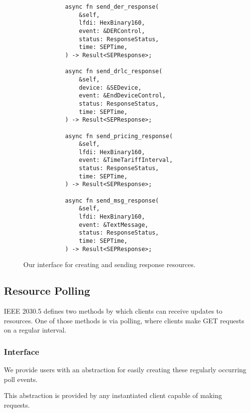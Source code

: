 \begin{figure}[h]
    \begin{center}
        \begin{lstlisting}
            async fn send_der_response(
                &self,
                lfdi: HexBinary160,
                event: &DERControl,
                status: ResponseStatus,
                time: SEPTime,
            ) -> Result<SEPResponse>;

            async fn send_drlc_response(
                &self,
                device: &SEDevice,
                event: &EndDeviceControl,
                status: ResponseStatus,
                time: SEPTime,
            ) -> Result<SEPResponse>;

            async fn send_pricing_response(
                &self,
                lfdi: HexBinary160,
                event: &TimeTariffInterval,
                status: ResponseStatus,
                time: SEPTime,
            ) -> Result<SEPResponse>;

            async fn send_msg_response(
                &self,
                lfdi: HexBinary160,
                event: &TextMessage,
                status: ResponseStatus,
                time: SEPTime,
            ) -> Result<SEPResponse>;
        \end{lstlisting}
        \label{fig:sendresponsefunc}
        \vspace{-10pt}
        \caption{Our interface for creating and sending response resources.}
    \end{center}
\end{figure}

\subsection{Resource Polling}
IEEE 2030.5 defines two methods by which clients can receive updates to resources. One of those methods is via polling, where clients make GET requests on a regular interval.

\subsubsection{Interface}
We provide users with an abstraction for easily creating these regularly occurring poll events.

This abstraction is provided by any instantiated client capable of making requests.

